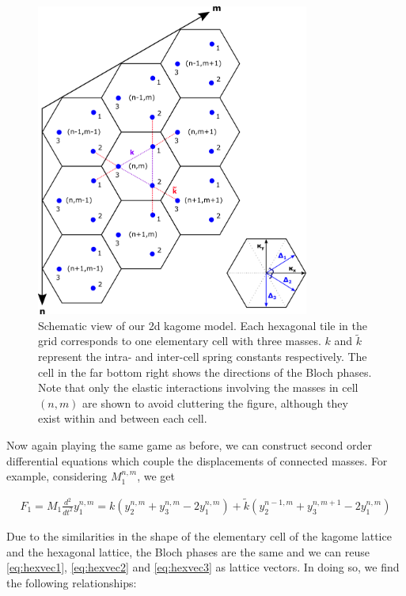 \begin{figure}[!h]
\centering
\includegraphics[width=0.8\textwidth]{imgs/kagomemodel.png}
\caption{\label{fig:kagomescheme} Schematic view of our 2d kagome model. Each
  hexagonal tile in the grid corresponds to one elementary cell with three
  masses. $k$ and $\tilde{k}$ represent the intra- and inter-cell spring
  constants respectively. The cell in the far bottom right shows the directions
  of the Bloch phases. Note that only the elastic interactions involving the
  masses in cell $(n,m)$ are shown to avoid cluttering the figure, although
  they exist within and between each cell.}
\end{figure}

Now again playing the same game as before, we can construct second order
differential equations which couple the displacements of connected masses. For
example, considering $M_1^{n,m}$, we get

\begin{align}
  F_1=M_1\frac{d^{2}}{dt^{2}}y_1^{n,m}
      =k\left(y_2^{n,m}+y_3^{n,m}-2y_1^{n,m}\right)+
       \tilde{k}\left(y_2^{n-1,m}+y_3^{n,m+1}-2y_1^{n,m}\right)
\label{eq:2dK1}
\end{align}

Due to the similarities in the shape of the elementary cell of the kagome
lattice and the hexagonal lattice, the Bloch phases are the same and we can
reuse \eqref{eq:hexvec1}, \eqref{eq:hexvec2} and \eqref{eq:hexvec3} as lattice
vectors. In doing so, we find the following relationships:

